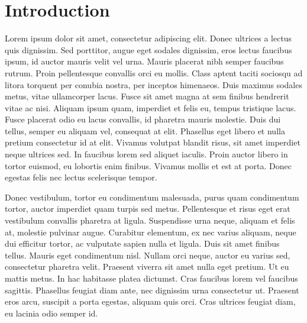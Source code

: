 \documentclass[../main.tex]{subfiles}
\begin{document}
\section{Introduction}

Lorem ipsum dolor sit amet, consectetur adipiscing elit. Donec ultrices a lectus quis dignissim. Sed porttitor, augue eget sodales dignissim, eros lectus faucibus ipsum, id auctor mauris velit vel urna. Mauris placerat nibh semper faucibus rutrum. Proin pellentesque convallis orci eu mollis. Class aptent taciti sociosqu ad litora torquent per conubia nostra, per inceptos himenaeos. Duis maximus sodales metus, vitae ullamcorper lacus. Fusce sit amet magna at sem finibus hendrerit vitae ac nisi. Aliquam ipsum quam, imperdiet et felis eu, tempus tristique lacus. Fusce placerat odio eu lacus convallis, id pharetra mauris molestie. Duis dui tellus, semper eu aliquam vel, consequat at elit. Phasellus eget libero et nulla pretium consectetur id at elit. Vivamus volutpat blandit risus, sit amet imperdiet neque ultrices sed. In faucibus lorem sed aliquet iaculis. Proin auctor libero in tortor euismod, eu lobortis enim finibus. Vivamus mollis et est at porta. Donec egestas felis nec lectus scelerisque tempor.

Donec vestibulum, tortor eu condimentum malesuada, purus quam condimentum tortor, auctor imperdiet quam turpis sed metus. Pellentesque et risus eget erat vestibulum convallis pharetra at ligula. Suspendisse urna neque, aliquam et felis at, molestie pulvinar augue. Curabitur elementum, ex nec varius aliquam, neque dui efficitur tortor, ac vulputate sapien nulla et ligula. Duis sit amet finibus tellus. Mauris eget condimentum nisl. Nullam orci neque, auctor eu varius sed, consectetur pharetra velit. Praesent viverra sit amet nulla eget pretium. Ut eu mattis metus. In hac habitasse platea dictumst. Cras faucibus lorem vel faucibus sagittis. Phasellus feugiat diam ante, nec dignissim urna consectetur ut. Praesent eros arcu, suscipit a porta egestas, aliquam quis orci. Cras ultrices feugiat diam, eu lacinia odio semper id. 
\end{document}

